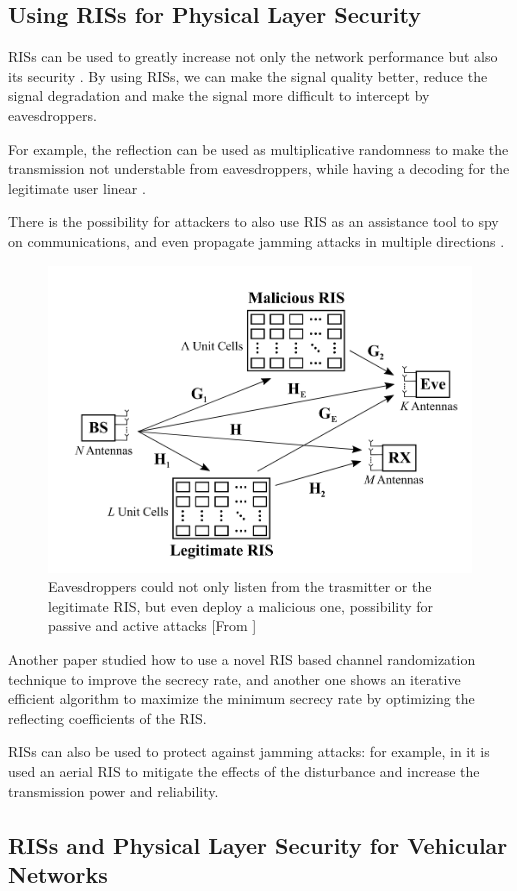 \subsection{Using RISs for Physical Layer Security}

RISs can be used to greatly increase not only the network performance but also its security \cite{10409564}. By using RISs, we can make the signal quality better, reduce the signal degradation and make the signal more difficult to intercept by eavesdroppers.

For example, the reflection can be used as multiplicative randomness to make the transmission not understable from eavesdroppers, while having a decoding for the legitimate user linear \cite{9328149}.

There is the possibility for attackers to also use RIS as an assistance tool to spy on communications, and even propagate jamming attacks in multiple directions \cite{10143983}.

\begin{figure}[H]
  \centering
  \includegraphics[width=0.5\linewidth]{imgs/RIS malicious.png}
  \caption{Eavesdroppers could not only listen from the trasmitter or the legitimate RIS, but even deploy a malicious one, possibility for passive and active attacks [From \cite{10143983}]}
\end{figure}

Another paper \cite{s21041439} studied how to use a novel RIS based channel randomization technique to improve the secrecy rate, and another one \cite{8742603} shows an iterative efficient algorithm to maximize the minimum secrecy rate by optimizing the reflecting coefficients of the RIS.

RISs can also be used to protect against jamming attacks: for example, in \cite{9424472} it is used an aerial RIS to mitigate the effects of the disturbance and increase the transmission power and reliability.

\subsection{RISs and Physical Layer Security for Vehicular Networks}

